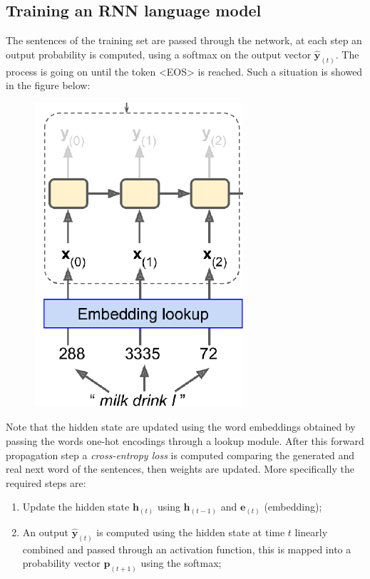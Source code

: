 \subsection{Training an RNN language model}
The sentences of the training set are passed through the network, at each step an output probability is computed, using a softmax on the output vector $\mathbf{\hat{y}}_{(t)}$. The process is going on until the token <EOS> is reached. Such a situation is showed in the figure below: 

\begin{multicols}{2}
    \begin{figure}[H]
        \centering
        \includegraphics[scale=0.8]{img/rnn_language.png}
    \end{figure}
    Note that the hidden state are updated using the word embeddings obtained by passing the words one-hot encodings through a lookup module.  After this forward propagation step a \textit{cross-entropy loss} is computed comparing the generated and real next word of the sentences, then weights are updated. More specifically the required steps are:
    \begin{enumerate}
        \itemsep-0.2em
        \item[\ding{202}] Update the hidden state $\mathbf{h}_{(t)}$ using $\mathbf{h}_{(t-1)}$ and $\mathbf{e}_{(t)}$ (embedding); 
        \item[\ding{203}] An output $\mathbf{\hat{y}}_{(t)}$ is computed using the hidden state at time $t$ linearly combined and passed through an activation function, this is mapped into a probability vector $\mathbf{p}_{(t+1)}$ using the softmax; 

\end{enumerate}
\end{multicols}
